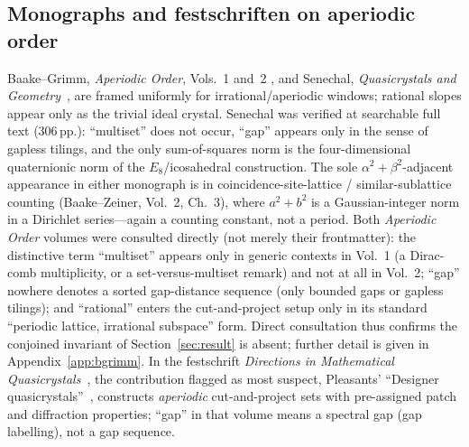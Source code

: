 \documentclass[11pt]{article}
\theoremstyle{plain}
\theoremstyle{remark}
\begin{document}
\subsection{Monographs and festschriften on aperiodic order}\label{ssec:books}

Baake--Grimm, \emph{Aperiodic Order}, Vols.~1 and~2
\cite{BaakeGrimm2013,BaakeGrimm2017}, and Senechal, \emph{Quasicrystals and
Geometry}~\cite{Senechal1995}, are framed uniformly for irrational/aperiodic
windows; rational slopes appear only as the trivial ideal crystal. Senechal was
verified at searchable full text ($306$\,pp.): ``multiset'' does not occur, ``gap''
appears only in the sense of gapless tilings, and the only sum-of-squares norm is
the four-dimensional quaternionic norm of the $E_8$/icosahedral construction. The
sole $\alpha^2+\beta^2$-adjacent appearance in either monograph is in
coincidence-site-lattice / similar-sublattice counting (Baake--Zeiner, Vol.~2,
Ch.~3), where $a^2+b^2$ is a Gaussian-integer norm in a Dirichlet series---again a
counting constant, not a period. Both \emph{Aperiodic Order} volumes were consulted
directly (not merely their frontmatter): the distinctive term ``multiset'' appears
only in generic contexts in Vol.~1 (a Dirac-comb multiplicity, or a
set-versus-multiset remark) and not at all in Vol.~2; ``gap'' nowhere denotes a
sorted gap-distance sequence (only bounded gaps or gapless tilings); and ``rational''
enters the cut-and-project setup only in its standard ``periodic lattice, irrational
subspace'' form. Direct consultation thus confirms the conjoined invariant of
Section~\ref{sec:result} is absent; further detail is given in
Appendix~\ref{app:bgrimm}. In the festschrift \emph{Directions in Mathematical
Quasicrystals}~\cite{BaakeMoody2000}, the contribution flagged as most suspect,
Pleasants' ``Designer quasicrystals''~\cite{Pleasants2000}, constructs
\emph{aperiodic} cut-and-project sets with pre-assigned patch and diffraction
properties; ``gap'' in that volume means a spectral gap (gap labelling), not a gap
sequence.
\end{document}
